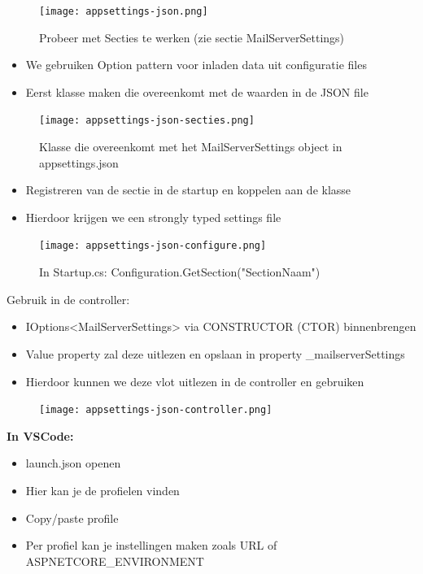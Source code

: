 \documentclass{article}
\begin{document}
\begin{figure}[H]
    \centering
    \texttt{[image: appsettings-json.png]}
    \caption{Probeer met Secties te werken (zie sectie MailServerSettings)}
\end{figure}

\begin{itemize}
    \item We gebruiken Option pattern voor inladen data uit configuratie files
    \item Eerst klasse maken die overeenkomt met de waarden in de JSON file
\end{itemize}

\begin{figure}[H]
    \centering
    \texttt{[image: appsettings-json-secties.png]}
    \caption{Klasse die overeenkomt met het MailServerSettings object in appsettings.json}
\end{figure}

\begin{itemize}
    \item Registreren van de sectie in de startup en koppelen aan de klasse
    \item Hierdoor krijgen we een strongly typed settings file
\end{itemize}

\begin{figure}[H]
    \centering
    \texttt{[image: appsettings-json-configure.png]}
    \caption{In Startup.cs: Configuration.GetSection("SectionNaam")}
\end{figure}

Gebruik in de controller: 

\begin{itemize}
    \item IOptions<MailServerSettings> via CONSTRUCTOR (CTOR) binnenbrengen
    \item Value property zal deze uitlezen en opslaan in property \_mailserverSettings
    \item Hierdoor kunnen we deze vlot uitlezen in de controller en gebruiken
\end{itemize}

\begin{figure}[H]
    \centering
    \texttt{[image: appsettings-json-controller.png]}
    \caption{}
\end{figure}

\textbf{In VSCode:}

\begin{itemize}
    \item launch.json openen
    \item Hier kan je de profielen vinden
    \item Copy/paste profile
    \item Per profiel kan je instellingen maken zoals URL of ASPNETCORE\_ENVIRONMENT
\end{itemize}
\end{document}
